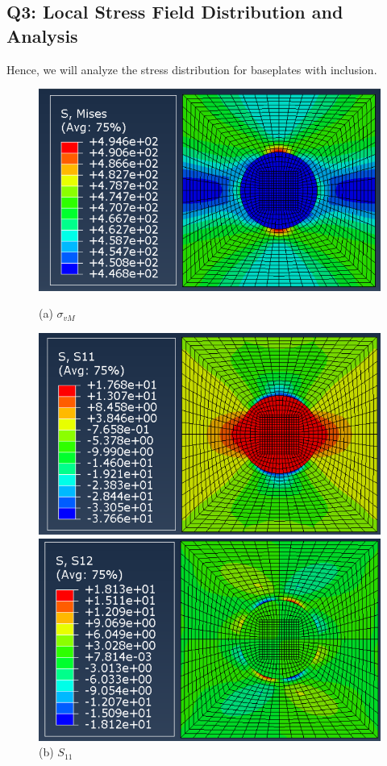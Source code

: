 \documentclass[12pt]{article}
\begin{document}
\subsection*{Q3: Local Stress Field Distribution and Analysis}
Hence, we will analyze the stress distribution for baseplates with inclusion. 
\begin{figure}[H]
    \centering
    \begin{minipage}{0.48\textwidth}
        \centering
        \includegraphics[width=\textwidth]{images/MISES.png}
        \caption*{(a) $\sigma_{vM}$}
    \end{minipage}
    \hfill
    \begin{minipage}{0.48\textwidth}
        \centering
        \includegraphics[width=\textwidth]{images/S11.png}
        \caption*{(b) $S_{11}$}
    \end{minipage}
    \vspace{1em}
    \begin{minipage}{0.48\textwidth}
        \centering
        \includegraphics[width=\textwidth]{images/S12.png}

\end{minipage}
\end{figure}
\end{document}
